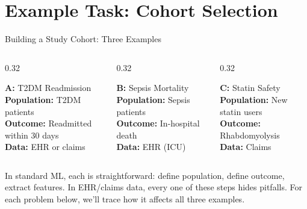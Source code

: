 \documentclass[aspectratio=169,10pt]{beamer}
\begin{document}




\section{Example Task: Cohort Selection}





\begin{frame}{Building a Study Cohort: Three Examples}
\begin{columns}[T]
\begin{column}{0.32\textwidth}
\begin{block}{\color{black}\textbf{A:} T2DM Readmission}
\small
\textbf{Population:} T2DM patients\\
\textbf{Outcome:} Readmitted within 30 days\\
\textbf{Data:} EHR or claims
\end{block}
\end{column}
\begin{column}{0.32\textwidth}
\begin{block}{\color{columbiaaccent}\textbf{B:} Sepsis Mortality}
\small
\textbf{Population:} Sepsis patients\\
\textbf{Outcome:} In-hospital death\\
\textbf{Data:} EHR (ICU)
\end{block}
\end{column}
\begin{column}{0.32\textwidth}
\begin{block}{\color{white}\textbf{C:} Statin Safety}
\small
\textbf{Population:} New statin users\\
\textbf{Outcome:} Rhabdomyolysis\\
\textbf{Data:} Claims
\end{block}
\end{column}
\end{columns}
\vspace{0.8em}
In standard ML, each is straightforward: define population, define outcome, extract features.
\vspace{0.3em}
\pause
\alert{In EHR/claims data, every one of these steps hides pitfalls.}
\vspace{0.2em}
For each problem below, we'll trace how it affects all three examples.
\end{frame}
\end{document}
